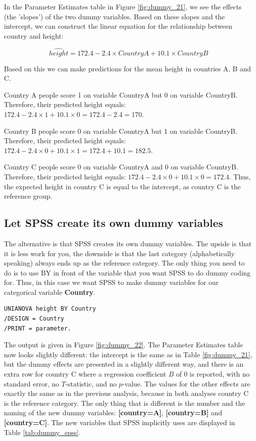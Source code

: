 \documentclass[]{book}\usepackage[]{graphicx}\usepackage[]{color}
\begin{document}
In the Parameter Estimates table in Figure \ref{fig:dummy_21}, we see the effects (the 'slopes') of the two dummy variables. Based on these slopes and the intercept, we can construct the linear equation for the relationship between country and height:

\begin{equation}
\widehat{height} = 172.4 - 2.4 \times CountryA + 10.1 \times CountryB 
\end{equation}

Based on this we can make predictions for the mean height in countries A, B and C. 

Country A people score 1 on variable CountryA but 0 on variable CountryB. Therefore, their predicted height equals: $172.4 - 2.4 \times 1 + 10.1 \times 0 =  172.4 - 2.4 = 170$.

Country B people score 0 on variable CountryA but 1 on variable CountryB. Therefore, their predicted height equals: $172.4 - 2.4 \times 0 + 10.1 \times 1 =  172.4 + 10.1 = 182.5$.

Country C people score 0 on variable CountryA and 0 on variable CountryB. Therefore, their predicted height equals: $172.4 - 2.4 \times 0 + 10.1 \times 0 =  172.4$. Thus, the expected height in country C is equal to the intercept, as country C is the reference group. 


\subsection{Let SPSS create its own dummy variables}


The alternative is that SPSS creates its own dummy variables. The upside is that it is less work for you, the downside is that the last category (alphabetically speaking) always ends up as the reference category. The only thing you need to do is to use BY in front of the variable that you want SPSS to do dummy coding for. Thus, in this case we want SPSS to make dummy variables for our categorical variable \textbf{Country}.



\begin{verbatim}
UNIANOVA height BY Country
/DESIGN = Country
/PRINT = parameter.
\end{verbatim}

The output is given in Figure \ref{fig:dummy_22}. The Parameter Estimates table now looks slightly different: the intercept is the same as in Table \ref{fig:dummy_21}, but the dummy effects are presented in a slightly different way, and there is an extra row for country C where a regression coefficient $B$ of 0 is reported, with no standard error, no $T$-statistic, and no $p$-value. The values for the other effects are exactly the same as in the previous analysis, because in both analyses country C is the reference category. The only thing that is different is the number and the naming of the new dummy variables: \textbf{[country=A]}, \textbf{[country=B]} and \textbf{[country=C]}. The new variables that SPSS implicitly uses are displayed in Table \ref{tab:dummy_spss}.
\end{document}
